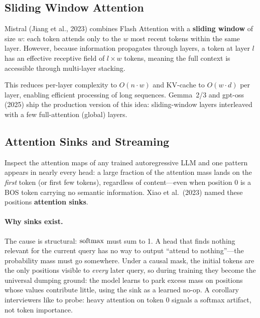 \subsection{Sliding Window Attention}

Mistral (Jiang et al., 2023) combines Flash Attention with a \textbf{sliding
window} of size $w$: each token attends only to the $w$ most recent tokens
within the same layer.  However, because information propagates through layers,
a token at layer $l$ has an effective receptive field of $l \times w$ tokens,
meaning the full context is accessible through multi-layer stacking.

This reduces per-layer complexity to $O(n \cdot w)$ and KV-cache to
$O(w \cdot d)$ per layer, enabling efficient processing of long sequences.
Gemma~2/3 and gpt-oss (2025) ship the production version of this idea:
sliding-window layers interleaved with a few full-attention (global)
layers.

\subsection{Attention Sinks and Streaming}
\label{sec:attention-sinks}

Inspect the attention maps of any trained autoregressive LLM and one
pattern appears in nearly every head: a large fraction of the attention
mass lands on the \emph{first} token (or first few tokens), regardless of
content---even when position 0 is a BOS token carrying no semantic
information.  Xiao et al.\ (2023) named these positions \textbf{attention
sinks}.

\paragraph{Why sinks exist.}
The cause is structural: $\operatorname{softmax}$ must sum to 1.  A head that finds
nothing relevant for the current query has no way to output ``attend to
nothing''---the probability mass must go somewhere.  Under a causal mask,
the initial tokens are the only positions visible to \emph{every} later
query, so during training they become the universal dumping ground: the
model learns to park excess mass on positions whose values contribute
little, using the sink as a learned no-op.  A corollary interviewers like
to probe: heavy attention on token 0 signals a softmax artifact, not token
importance.

